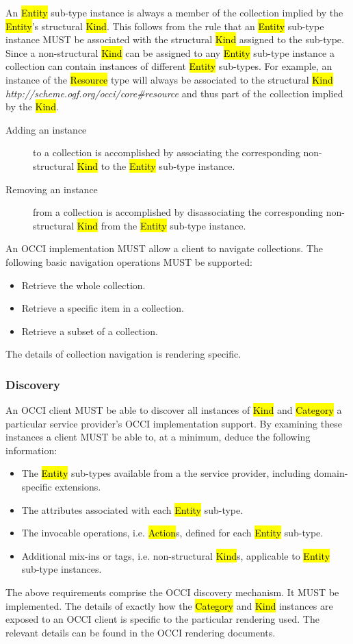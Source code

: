 \documentclass[10pt,a4paper,british]{article}
\begin{document}
An \hl{Entity} sub-type instance is always a member of the collection implied
by the \hl{Entity}'s structural \hl{Kind}. This follows from the rule that an
\hl{Entity} sub-type instance MUST be associated with the structural \hl{Kind}
assigned to the sub-type.
Since a non-structural \hl{Kind} can be assigned to any \hl{Entity} sub-type
instance a collection can contain instances of different \hl{Entity} sub-types.
%
For example, an instance of the \hl{Resource} type will always be associated
to the structural \hl{Kind}
\textit{http://scheme.ogf.org/occi/core\#resource} and thus part of the
collection implied by the \hl{Kind}.
\begin{description}
\item[Adding an instance] to a collection is accomplished by associating the
corresponding non-structural \hl{Kind} to the \hl{Entity} sub-type instance.
\item[Removing an instance] from a collection is accomplished by disassociating the
corresponding non-structural \hl{Kind} from the \hl{Entity} sub-type instance.
\end{description}
%
An OCCI implementation MUST allow a client to navigate collections. The
following basic navigation operations MUST be supported:
\begin{itemize}
\item Retrieve the whole collection.
\item Retrieve a specific item in a collection.
\item Retrieve a subset of a collection.
\end{itemize}
The details of collection navigation is rendering specific.

\subsubsection{Discovery}
\label{sec:discovery}
An OCCI client MUST be able to discover all instances of \hl{Kind} and
\hl{Category} a particular service provider's OCCI implementation support. By
examining these instances a client MUST be able to, at a minimum, deduce the
following information:
\begin{itemize}
\item The \hl{Entity} sub-types available from a the service provider, including domain-specific extensions.
\item The attributes associated with each \hl{Entity} sub-type.
\item The invocable operations, i.e. \hl{Action}s, defined for each \hl{Entity} sub-type.
\item Additional mix-ins or tags, i.e. non-structural \hl{Kind}s, applicable to
 \hl{Entity} sub-type instances.
\end{itemize}
The above requirements comprise the OCCI discovery mechanism. It MUST be
implemented.
%
The details of exactly how the \hl{Category} and \hl{Kind} instances are
exposed to an OCCI client is specific to the particular rendering used.
The relevant details can be found in the OCCI rendering documents.
\end{document}
